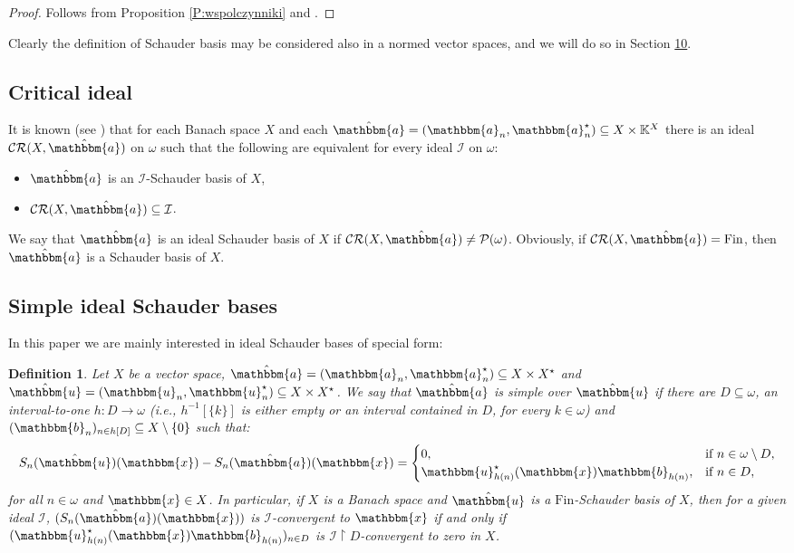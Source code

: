 \documentclass[10pt,a4paper]{amsart}
\newcommand{\IK}{\mathbb{K}}
\newcommand{\I}{\mathcal{I}}
\newcommand{\Fin}{\mathrm{Fin}}
\newcommand{\CR}{\mathcal{CR}}
\newcommand{\w}{\mathbbm}
\newtheorem{definition}[theorem]{Definition}
\begin{document}
\begin{proof}
Follows from Proposition \ref{P:wspolczynniki} and \cite[Theorem A]{RKS}.
\end{proof}


Clearly the definition of Schauder basis may be considered also in a normed vector spaces, and we will do so in Section \href{https://arxiv.org/abs/2508.21235v1}{10}.

\subsection{Critical ideal}

It is known (see \cite[Proof of Theorem B]{RKS}) that for each Banach space $X$ and each $\hat{\w{a}}=(\w{a}_n,\w{a}^\star_n)\subseteq X\times \IK^X$ there is an ideal $\CR(X,\hat{\w{a}})$ on $\omega$ such that the following are equivalent for every ideal $\I$ on $\omega$:
\begin{itemize}
    \item $\hat{\w{a}}$ is an $\I$-Schauder basis of $X$,
    \item $\CR(X,\hat{\w{a}})\subseteq\I$.
\end{itemize}
We say that $\hat{\w{a}}$ is an ideal Schauder basis of $X$ if $\CR(X,\hat{\w{a}})\neq\mathcal{P}(\omega)$. Obviously, if $\CR(X,\hat{\w{a}})=\Fin$, then $\hat{\w{a}}$ is a Schauder basis of $X$.

\subsection{Simple ideal Schauder bases}

In this paper we are mainly interested in ideal Schauder bases of special form:

\begin{definition}
\label{def-simple}
Let $X$ be a vector space, $\hat{\w{a}}=(\w{a}_n,\w{a}^\star_n)\subseteq X\times X^\star$ and $\hat{\w{u}}=(\w{u}_n,\w{u}^\star_n)\subseteq X\times X^\star$. We say that $\hat{\w{a}}$ is simple over $\hat{\w{u}}$ if there are $D\subseteq\omega$, an interval-to-one $h:D\to\omega$ (i.e., $h^{-1}[\{k\}]$ is either empty or an interval contained in $D$, for every $k\in\omega$) and $(\w{b}_n)_{n\in h[D]}\subseteq X\setminus\{0\}$ such that:
\[
S_n(\hat{\w{u}})(\w{x})-S_n(\hat{\w{a}})(\w{x})=
\begin{cases}
    0, & \text{if }n\in\omega\setminus D,\\
    \w{u}_{h(n)}^\star(\w{x})\w{b}_{h(n)}, & \text{if }n\in D,
\end{cases}
\]
for all $n\in \omega$ and $\w{x}\in X$. In particular, if $X$ is a Banach space and $\hat{\w{u}}$ is a $\Fin$-Schauder basis of $X$, then for a given ideal $\I$, $(S_n(\hat{\w{a}})(\w{x}))$ is $\I$-convergent to $\w{x}$ if and only if $(\w{u}_{h(n)}^\star(\w{x})\w{b}_{h(n)})_{n\in D}$ is $\I\restriction D$-convergent to zero in $X$.
\end{definition}
\end{document}
